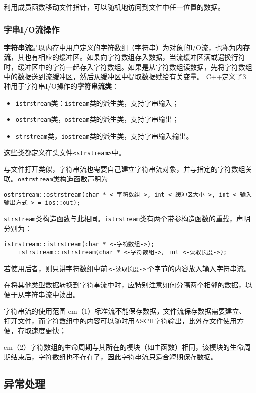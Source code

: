 \documentclass[10pt, a4paper, oneside, fontset=none]{ctexart}
\theoremstyle{plain}
\theoremstyle{definition}
\newcommand{\hang}[1][1]{\hangafter 1 \hangindent #1em}
\newcommand{\zhu}[2][]{\begin{note}{#1}\xiu #2\end{note}}
\newcommand{\tboba}[1]{\textbf{\kai\color{bali!75!black}#1}}
\begin{document}
利用成员函数移动文件指针，可以随机地访问到文件中任一位置的数据。


\subsubsection{字串I/O流操作}

\tboba{字符串流}是以内存中用户定义的字符数组（字符串）为对象的I/O流，也称为\textbf{内存流}，其也有相应的缓冲区。如果向字符数组存入数据，当流缓冲区满或遇换行符时，缓冲区中的字符一起存入字符数组。如果是从字符数组读数据，先将字符数组中的数据送到流缓冲区，然后从缓冲区中提取数据赋给有关变量。
C++定义了3种用于字符串I/O操作的\tboba{字符串流类}：
\begin{itemize}[topsep=0pt]
	\item \texttt{istrstream}类：\texttt{istream}类的派生类，支持字串输入；
	\item \texttt{ostrstream}类，\texttt{ostream}类的派生类，支持字串输出；
	\item \texttt{strstream}类，\texttt{iostream}类的派生类，支持字串输入输出。
\end{itemize}
这些类都定义在头文件\texttt{<strstream>}中。

与文件打开类似，字符串流也需要自己建立字符串流对象，并与指定的字符数组关联。\texttt{ostrstream}类构造函数声明为
\begin{lstlisting}[style=intro]
	ostrstream::ostrstream(char * <-字符数组->, int <-缓冲区大小->, int <-输入输出方式-> = ios::out);
\end{lstlisting}
\texttt{strstream}类构造函数与此相同。\texttt{istrstream}类有两个带参构造函数的重载，声明分别为：
\begin{lstlisting}[style=intro]
	istrstream::istrstream(char * <-字符数组->);
	istrstream::istrstream(char * <-字符数组->, int <-读取长度->);
\end{lstlisting}
若使用后者，则只讲字符数组中前\,\lstinline[style=intro]|<-读取长度->|\,个字节的内容放入输入字符串流。

在将其他类型数据转换到字符串流中时，应特别注意如何分隔两个相邻的数据，以便于从字符串流中读出。

\zhu[字符串流的使用范围]{
	\hang[2]（1）标准流不能保存数据，文件流保存数据需要建立、打开文件，而字符数组中的内容可以随时用ASCII字符输出，比外存文件使用方便，存取速度更快；
	
	\hang[2]（2）字符数组的生命周期与其所在的模块（如主函数）相同，该模块的生命周期结束后，字符数组也不存在了，因此字符串流只适合短期保存数据。
}

\subsection{异常处理}
\end{document}
